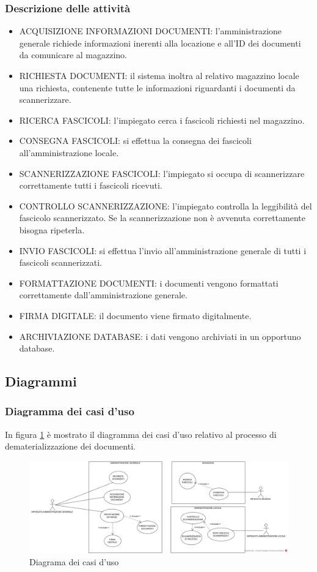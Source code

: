 \documentclass{article}
\begin{document}
\subsubsection{Descrizione delle attività}
\begin{itemize}
    \item ACQUISIZIONE INFORMAZIONI DOCUMENTI: l'amministrazione generale richiede informazioni inerenti alla locazione e all'ID dei documenti da comunicare al magazzino.
    \item RICHIESTA DOCUMENTI: il sistema inoltra al relativo magazzino locale una richiesta, contenente tutte le informazioni riguardanti i documenti da scannerizzare.
    \item RICERCA FASCICOLI: l'impiegato cerca i fascicoli richiesti nel magazzino.
    \item CONSEGNA FASCICOLI: si effettua la consegna dei fascicoli all'amministrazione locale.
    \item SCANNERIZZAZIONE FASCICOLI: l'impiegato si occupa di scannerizzare correttamente tutti i fascicoli ricevuti.
    \item CONTROLLO SCANNERIZZAZIONE: l'impiegato controlla la leggibilità del fascicolo scannerizzato. Se la scannerizzazione non è avvenuta correttamente bisogna ripeterla.
    \item INVIO FASCICOLI: si effettua l'invio all'amministrazione generale di tutti i fascicoli scannerizzati.
    \item FORMATTAZIONE DOCUMENTI: i documenti vengono formattati correttamente dall'amministrazione generale.
    \item FIRMA DIGITALE: il documento viene firmato digitalmente.
    \item ARCHIVIAZIONE DATABASE: i dati vengono archiviati in un opportuno database.
\end{itemize}

\subsection{Diagrammi}
\subsubsection{Diagramma dei casi d'uso}
In figura \ref{fig:1} è mostrato il diagramma dei casi d'uso relativo al processo di dematerializzazione dei documenti.

\begin{figure}[H]
    \centering
    \includegraphics[scale=0.3]{Homework1 - Diagramma dei casi d'uso.png}
    \caption{Diagrama dei casi d'uso}
    \label{fig:1}
\end{figure}
\end{document}
